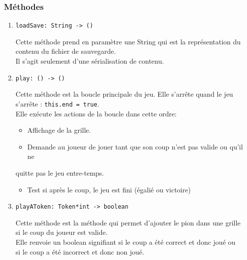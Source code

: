 \documentclass[11pt]{article}
\begin{document}
\subsubsection{Méthodes}
\label{sec:org25ca641}
\begin{enumerate}
\item \texttt{loadSave: String -> ()}
\label{sec:org70b72b2}

Cette méthode prend en paramètre une String qui est la représentation du\\
contenu du fichier de sauvegarde.\\

Il s'agit seulement d'une sérialisation de contenu.\\

\item \texttt{play: () -> ()}
\label{sec:orgb30214e}

Cette méthode est la boucle principale du jeu. Elle s'arrête quand le jeu\\
s'arrête : \texttt{this.end = true}.\\

Elle exécute les actions de la boucle dans cette ordre:\\
\begin{itemize}
\item Affichage de la grille.\\
\item Demande au joueur de jouer tant que son coup n'est pas valide ou qu'il ne\\
\end{itemize}
quitte pas le jeu entre-temps.\\
\begin{itemize}
\item Test si après le coup, le jeu est fini (égalié ou victoire)\\
\end{itemize}

\item \texttt{playAToken: Token*int -> boolean}
\label{sec:org231b3c6}

Cette méthode est la méthode qui permet d'ajouter le pion dans une grille\\
si le coup du joueur est valide.\\

Elle renvoie un boolean signifiant si le coup a été correct et donc joué ou\\
si le coup a été incorrect et donc non joué.\\


\end{enumerate}
\end{document}

